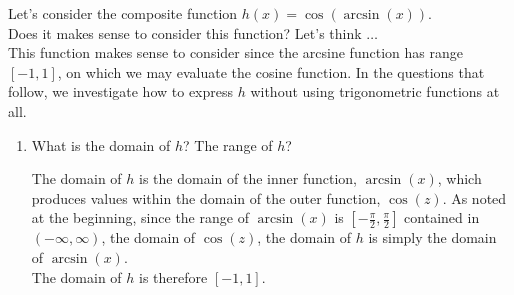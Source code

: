 \documentclass{ximera}
\begin{document}
\begin{example}

Let's consider the composite function $h(x) = \cos(\arcsin(x))$.  \\
Does it makes sense to consider this function? Let's think $\dots$ \\
This function makes sense to consider since the arcsine function has range $[-1,1]$, on which we may evaluate the cosine function. In the questions that follow, we investigate how to express $h$ without using trigonometric functions at all.%
\par
%
\begin{enumerate}

\item What is the domain of $h$?  The range of $h$? \\
%
\begin{explanation}
The domain of $h$ is the domain of the inner function, $\arcsin(x)$, which produces values within the domain of the outer function, $\cos(z)$. As noted at the beginning, since the range of $\arcsin(x)$ is $\left[-\frac{\pi}{2},\frac{\pi}{2}\right]$ contained in $(-\infty,\infty)$, the domain of $\cos(z)$, the domain of $h$ is simply the domain of $\arcsin(x)$. \\
The domain of $h$ is therefore $[-1,1]$.


\end{explanation}
\end{enumerate}
\end{example}
\end{document}
